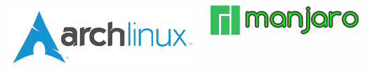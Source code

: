 \begin{frame}
	
	
	\vfill
	
	\begin{columns}
		\begin{column}{.5\linewidth}
			\centering\includegraphics[height=3\baselineskip]{../graphics/logos/Arch/archlinux-logo-dark-1200dpi.b42bd35d5916.png}
		\end{column}
		\hfill
		\begin{column}{.5\linewidth}
			\centering\includegraphics[height=2\baselineskip]{../graphics/logos/Manjaro/Main_page_logo.png}
		\end{column}
	\end{columns}
\end{frame}
